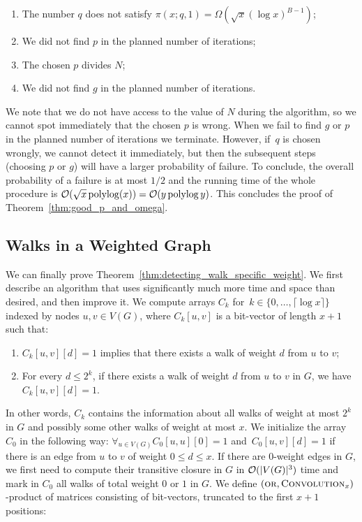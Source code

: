 \begin{enumerate}
 \item The number $q$ does not satisfy $\pi(x;q,1) = \Omega(\sqrt{x}(\log x)^{B-1})$;
 \item We did not find $p$ in the planned number of iterations;
 \item The chosen $p$ divides $N$; 
 \item We did not find $g$ in the planned number of iterations.
\end{enumerate}
We note that we do not have access to the value of $N$ during the algorithm, so we cannot spot immediately that the chosen $p$ is wrong.
When we fail to find $g$ or $p$ in the planned number of iterations we terminate.
However,  if~$q$ is chosen wrongly, we cannot detect it immediately, but then the subsequent steps (choosing $p$ or $g$) will have a larger probability of failure.
To conclude, the overall probability of a failure is at most $1/2$ and the running time of the whole procedure is $\mathcal{O}(\sqrt x\operatorname{polylog}(x))=\mathcal{O}(y\operatorname{polylog} y)$.
This concludes the proof of Theorem~\ref{thm:good_p_and_omega}.



\subsection{Walks in a Weighted Graph} 
We can finally prove Theorem~\ref{thm:detecting_walk_specific_weight}. We first describe an algorithm that uses significantly much more time and space than desired, and then improve it.
 We compute arrays $C_k$ for~$k\in \{0,\ldots, \lceil \log x \rceil\}$ indexed by nodes $u,v\in V(G)$, where $C_k[u,v]$ is a bit-vector of length $x+1$ such that:
 \begin{enumerate}
  \item $C_k[u,v][d]=1$ implies that there exists a walk of weight $d$ from $u$ to $v$;
  \item For every $d\leq 2^k$, if there exists a walk of weight $d$ from $u$ to $v$ in $G$, we have $C_k[u,v][d]=1$.
 \end{enumerate}
In other words, $C_k$ contains the information about all walks of weight at most $2^k$ in $G$ and possibly some other walks of weight at most $x$.
We initialize the array $C_0$ in the following way: $\forall_{u\in V(G)} C_0[u,u][0]=1$ and~$C_0[u,v][d]=1$ if there is an edge from $u$ to $v$ of weight $0 \le d \le x$.
If there are 0-weight edges in $G$, we first need to compute their transitive closure in $G$ in $\mathcal{O}(|V(G)|^3)$ time and mark in $C_0$ all walks of total weight $0$ or $1$ in $G$.
We define $(\textsc{or},\textsc{Convolution}_x)$-product of matrices consisting of bit-vectors, truncated to the first $x+1$ positions:

